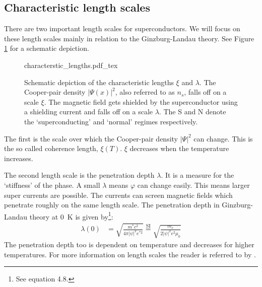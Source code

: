 \subsection{Characteristic length scales}
\label{sec:characteristic-length-scales}
There are two important length scales for superconductors. We will focus on these length scales mainly in relation to the Ginzburg-Landau theory. See Figure \ref{fig:characteristic-lengths} for a schematic depiction.

\begin{figure}[ht!]
	\centering
	\def\svgwidth{\textwidth}
	{characterstic_lengths.pdf_tex}
	\caption{Schematic depiction of the characteristic lengths $\xi$ and $\lambda$. The Cooper-pair density $|\Psi(x)|^2$, also referred to as $n_s$, falls off on a scale $\xi$. The magnetic field gets shielded by the superconductor using a shielding current and falls off on a scale $\lambda$. The S and N denote the `superconducting' and `normal' regimes respectively.}
	\label{fig:characteristic-lengths}
\end{figure}

The first is the scale over which the Cooper-pair density $|\Psi|^2$ can change. This is the so called coherence length, $\xi(T)$. $\xi$ decreases when the temperature increases\cite{tinkhamIntroductionSuperconductivity}.

The second length scale is the penetration depth $\lambda$. It is a measure for the `stiffness' of the phase. A small $\lambda$ means $\varphi$ can change easily. This means larger super currents are possible. The currents can screen magnetic fields which penetrate roughly on the same length scale. The penetration depth in Ginzburg-Landau theory at \qty{0}{\kelvin} is given by\footnote{See  equation 4.8.}:
\begin{align}
	\lambda(0) &= \sqrt{\frac{m^*c^2}{4\pi|\psi|^2e^{*2}}} \stackrel{\text{SI}}{=} \sqrt{\frac{m_e}{2|\psi|^2e^2\mu_0}}
	\label{eqn:london-penetration-depth}
\end{align}
The penetration depth too is dependent on temperature and decreases for higher temperatures. For more information on length scales the reader is referred to  by \citeauthor{tinkhamIntroductionSuperconductivity}.

